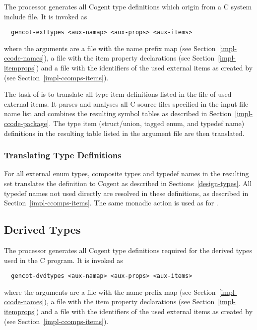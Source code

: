 The processor  generates all Cogent type definitions which origin from a C system include file.
It is invoked as
\begin{verbatim}
  gencot-exttypes <aux-namap> <aux-props> <aux-items>
\end{verbatim}
where the arguments are a file  with the name prefix map 
(see Section~\ref{impl-ccode-names}), a file  with the item property declarations (see 
Section~\ref{impl-itemprops}) and a file  with the identifiers of the used external items as created 
by  (see Section~\ref{impl-ccomps-items}).

The task of  is to translate all type item definitions listed in the 
file of used external items. It parses and analyses
all C source files specified in the input file name list and combines the resulting symbol tables as
described in Section~\ref{impl-ccode-package}. The type item (struct/union, tagged enum, and typedef name) definitions 
in the resulting table listed in the argument file are then translated.

\subsubsection{Translating Type Definitions}

For all external enum types, composite types and typedef names in the resulting set  translates the
definition to Cogent as described in Sections~\ref{design-types}.
All typedef names not used directly are resolved in these definitions, as described in Section~\ref{impl-ccomps-items}.
The same monadic action  is used as for .

\subsection{Derived Types}
\label{impl-ccomps-dvdtypes}

The processor  generates all Cogent type definitions required for the derived types
used in the C program. It is invoked as
\begin{verbatim}
  gencot-dvdtypes <aux-namap> <aux-props> <aux-items>
\end{verbatim}
where the arguments are a file  with the name prefix map 
(see Section~\ref{impl-ccode-names}), a file  with the item property declarations (see 
Section~\ref{impl-itemprops}) and a file  with the identifiers of the used external items as created 
by  (see Section~\ref{impl-ccomps-items}).

